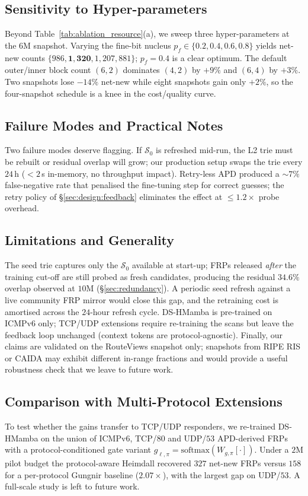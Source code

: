 \documentclass[conference]{IEEEtran}
\begin{document}
\subsection{Sensitivity to Hyper-parameters}
Beyond Table~\ref{tab:ablation_resource}(a), we sweep three
hyper-parameters at the $6$M snapshot.  Varying the fine-bit
nucleus $p_f\!\in\!\{0.2,0.4,0.6,0.8\}$ yields net-new counts
$\{986,\mathbf{1{,}320},1{,}207,881\}$; $p_f\!=\!0.4$ is a clear
optimum.  The default outer/inner block count $(6,2)$ dominates
$(4,2)$ by $+9\%$ and $(6,4)$ by $+3\%$.  Two snapshots lose
$-14\%$ net-new while eight snapshots gain only $+2\%$, so the
four-snapshot schedule is a knee in the cost/quality curve.

\subsection{Failure Modes and Practical Notes}
Two failure modes deserve flagging.  If $\mathcal{S}_{0}$ is
refreshed mid-run, the L2 trie must be rebuilt or residual
overlap will grow; our production setup swaps the trie every
$24$\,h ($<\!2$\,s in-memory, no throughput impact).
Retry-less APD produced a $\sim\!7\%$ false-negative rate
that penalised the fine-tuning step for correct guesses; the
retry policy of \S\ref{sec:design:feedback} eliminates the
effect at $\leq\!1.2\times$ probe overhead.

\subsection{Limitations and Generality}
The seed trie captures only the $\mathcal{S}_{0}$ available at
start-up; FRPs released \emph{after} the training cut-off are
still probed as fresh candidates, producing the residual
$34.6\%$ overlap observed at $10$M (\S\ref{sec:redundancy}).  A
periodic seed refresh against a live community FRP mirror would
close this gap, and the retraining cost is amortised across the
$24$-hour refresh cycle.  DS-HMamba is pre-trained on ICMPv6 only;
TCP/UDP extensions require re-training the scans but leave the
feedback loop unchanged (context tokens are protocol-agnostic).
Finally, our claims are validated on the RouteViews
snapshot only; snapshots from RIPE RIS or CAIDA may exhibit
different in-range fractions and would provide a useful robustness
check that we leave to future work.

\subsection{Comparison with Multi-Protocol Extensions}
To test whether the gains transfer to TCP/UDP responders, we
re-trained DS-HMamba on the union of ICMPv6, TCP/$80$ and UDP/$53$
APD-derived FRPs with a protocol-conditioned gate variant
$g_{\ell,\pi}\!=\!\mathrm{softmax}(W_{g,\pi}[\cdot])$.  Under a $2$M
pilot budget the protocol-aware Heimdall recovered $327$ net-new
FRPs versus $158$ for a per-protocol Gungnir baseline
($2.07\times$), with the largest gap on UDP/$53$.  A full-scale
study is left to future work.
\end{document}
